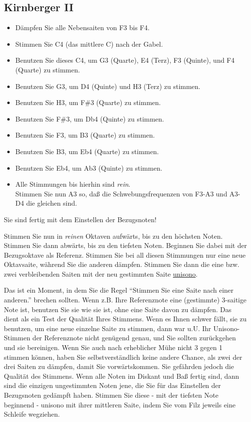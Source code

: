 \subsection{Kirnberger II}
\begin{itemize}
	\item Dämpfen Sie alle Nebensaiten von F3 bis F4.
	\item Stimmen Sie C4 (das mittlere C) nach der Gabel.
	\item Benutzen Sie dieses C4, um G3 (Quarte), E4 (Terz), F3 (Quinte), und F4 (Quarte) zu stimmen.
	\item Benutzen Sie G3, um D4 (Quinte) und H3 (Terz) zu stimmen.
	\item Benutzen Sie H3, um F\#3 (Quarte) zu stimmen.
	\item Benutzen Sie F\#3, um Db4 (Quinte) zu stimmen.
	\item Benutzen Sie F3, um B3 (Quarte) zu stimmen.
	\item Benutzen Sie B3, um Eb4 (Quarte) zu stimmen.
	\item Benutzen Sie Eb4, um Ab3 (Quinte) zu stimmen.
	\item Alle Stimmungen bis hierhin sind \textit{rein}.
\\
 Stimmen Sie nun A3 so, daß die Schwebungsfrequenzen von F3-A3 und A3-D4 die gleichen sind.
\end{itemize}


 Sie sind fertig mit dem Einstellen der Bezugsnoten!
 \hypertarget{c2_6_kirn2}{}

Stimmen Sie nun in \textit{reinen} Oktaven aufwärts, bis zu den höchsten Noten.
 Stimmen Sie dann abwärts, bis zu den tiefsten Noten.
 Beginnen Sie dabei mit der Bezugsoktave als Referenz.
 Stimmen Sie bei all diesen Stimmungen nur eine neue Oktavsaite, während Sie die anderen dämpfen.
 Stimmen Sie dann die eine bzw. zwei verbleibenden Saiten mit der neu gestimmten Saite \hyperlink{c2_5_unis}{unisono}.
 

Das ist ein Moment, in dem Sie die Regel \enquote{Stimmen Sie eine Saite nach einer anderen.} brechen sollten.
 Wenn z.B. Ihre Referenznote eine (gestimmte) 3-saitige Note ist, benutzen Sie sie wie sie ist, ohne eine Saite davon zu dämpfen.
 Das dient als ein Test der Qualität Ihres Stimmens.
 Wenn es Ihnen schwer fällt, sie zu benutzen, um eine neue einzelne Saite zu stimmen, dann war u.U. Ihr Unisono-Stimmen der Referenznote nicht genügend genau, und Sie sollten zurückgehen und sie bereinigen.
 Wenn Sie auch nach erheblicher Mühe nicht 3 gegen 1 stimmen können, haben Sie selbstverständlich keine andere Chance, als zwei der drei Saiten zu dämpfen, damit Sie vorwärtskommen.
 Sie gefährden jedoch die Qualität des Stimmens.
 Wenn alle Noten im Diskant und Baß fertig sind, dann sind die einzigen ungestimmten Noten jene, die Sie für das Einstellen der Bezugsnoten gedämpft haben.
 Stimmen Sie diese - mit der tiefsten Note beginnend - unisono mit ihrer mittleren Saite, indem Sie vom Filz jeweils eine Schleife wegziehen.
 \hypertarget{c2_6d}{}\hypertarget{c2_6_et}{}


